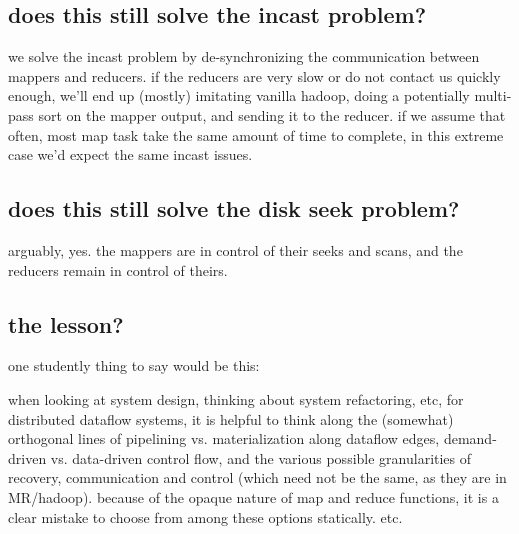 \subsection{does this still solve the incast problem?}

we solve the incast problem by de-synchronizing the communication between mappers and reducers.  if the reducers are very slow or do not contact us quickly enough, we'll end up (mostly) imitating vanilla hadoop, doing a potentially multi-pass sort on the mapper output, and sending it to the reducer.  if we assume that often, most map task take the same amount of time to complete, in this extreme case we'd expect the same incast issues.

\subsection{does this still solve the disk seek problem?}

arguably, yes.  the mappers are in control of their seeks and scans, and the reducers remain in control of theirs.

\subsection{the lesson?}

one studently thing to say would be this:

when looking at system design, thinking about system refactoring, etc, for distributed dataflow systems, it is helpful to think along the (somewhat) orthogonal lines of pipelining vs. materialization along dataflow edges, demand-driven vs. data-driven control flow, and the various possible granularities of recovery, communication and control (which need not be the same, as they are in MR/hadoop). because of the opaque nature of map and reduce functions, it is a clear mistake to choose from among these options statically.  etc.
